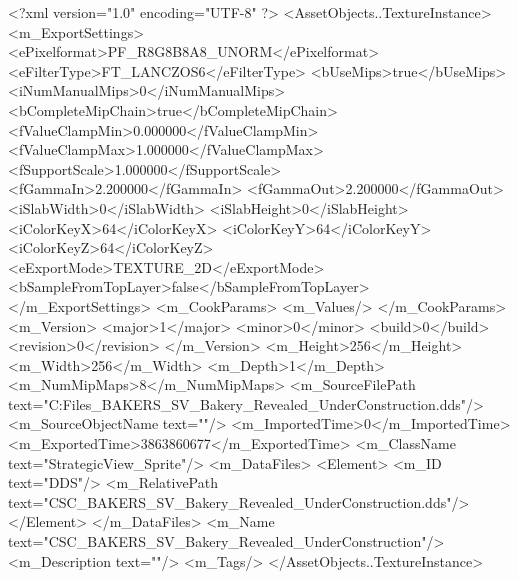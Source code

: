 <?xml version="1.0" encoding="UTF-8" ?>
<AssetObjects..TextureInstance>
	<m_ExportSettings>
		<ePixelformat>PF_R8G8B8A8_UNORM</ePixelformat>
		<eFilterType>FT_LANCZOS6</eFilterType>
		<bUseMips>true</bUseMips>
		<iNumManualMips>0</iNumManualMips>
		<bCompleteMipChain>true</bCompleteMipChain>
		<fValueClampMin>0.000000</fValueClampMin>
		<fValueClampMax>1.000000</fValueClampMax>
		<fSupportScale>1.000000</fSupportScale>
		<fGammaIn>2.200000</fGammaIn>
		<fGammaOut>2.200000</fGammaOut>
		<iSlabWidth>0</iSlabWidth>
		<iSlabHeight>0</iSlabHeight>
		<iColorKeyX>64</iColorKeyX>
		<iColorKeyY>64</iColorKeyY>
		<iColorKeyZ>64</iColorKeyZ>
		<eExportMode>TEXTURE_2D</eExportMode>
		<bSampleFromTopLayer>false</bSampleFromTopLayer>
	</m_ExportSettings>
	<m_CookParams>
		<m_Values/>
	</m_CookParams>
	<m_Version>
		<major>1</major>
		<minor>0</minor>
		<build>0</build>
		<revision>0</revision>
	</m_Version>
	<m_Height>256</m_Height>
	<m_Width>256</m_Width>
	<m_Depth>1</m_Depth>
	<m_NumMipMaps>8</m_NumMipMaps>
	<m_SourceFilePath text="C:\Users\Shadow\Desktop\Working Files\Icons\StrategicView\CSC_BAKERS_SV_Bakery_Revealed_UnderConstruction.dds"/>
	<m_SourceObjectName text=""/>
	<m_ImportedTime>0</m_ImportedTime>
	<m_ExportedTime>3863860677</m_ExportedTime>
	<m_ClassName text="StrategicView_Sprite"/>
	<m_DataFiles>
		<Element>
			<m_ID text="DDS"/>
			<m_RelativePath text="CSC_BAKERS_SV_Bakery_Revealed_UnderConstruction.dds"/>
		</Element>
	</m_DataFiles>
	<m_Name text="CSC_BAKERS_SV_Bakery_Revealed_UnderConstruction"/>
	<m_Description text=""/>
	<m_Tags/>
</AssetObjects..TextureInstance>

